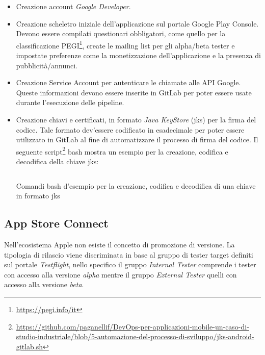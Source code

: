 \begin{itemize}
    \item Creazione account \textit{Google Developer}.
    
    \item Creazione scheletro iniziale dell'applicazione sul portale Google Play Console. Devono essere compilati questionari obbligatori, come quello per la classificazione PEGI\footnote{\href{https://pegi.info/it}{https://pegi.info/it}}, create le mailing list per gli alpha/beta tester e impostate preferenze come la monetizzazione dell'applicazione e la presenza di pubblicità/annunci.
    
    \item Creazione Service Account per autenticare le chiamate alle API Google. Queste informazioni devono essere inserite in GitLab per poter essere usate durante l'esecuzione delle pipeline.
    
    \item Creazione chiavi e certificati, in formato \textit{Java KeyStore} (jks) per la firma del codice. Tale formato dev'essere codificato in esadecimale per poter essere utilizzato in GitLab al fine di automatizzare il processo di firma del codice. Il seguente script\footnote{\href{https://github.com/paganellif/DevOps-per-applicazioni-mobile-un-caso-di-studio-industriale/blob/5-automazione-del-processo-di-sviluppo/jks-android-gitlab.sh}{https://github.com/paganellif/DevOps-per-applicazioni-mobile-un-caso-di-studio-industriale/blob/5-automazione-del-processo-di-sviluppo/jks-android-gitlab.sh}} bash mostra un esempio per la creazione, codifica e decodifica della chiave jks:

    \begin{listing}[H]
        \inputminted{bash}{code/jks-android-gitlab.sh}
        \caption{Comandi bash d'esempio per la creazione, codifica e decodifica di una chiave in formato jks}
    \end{listing}
\end{itemize}

\subsection{App Store Connect}
Nell'ecosistema Apple non esiste il concetto di promozione di versione. 
La tipologia di rilascio viene discriminata in base al gruppo di tester target definiti sul portale \textit{Testflight}, 
nello specifico il gruppo \textit{Internal Tester} comprende i tester con accesso alla versione \textit{alpha} mentre il gruppo \textit{External Tester} quelli con accesso alla versione \textit{beta}. 

